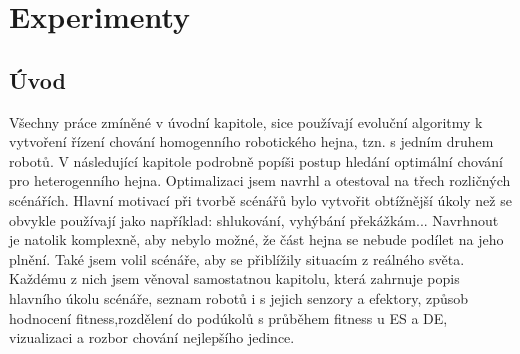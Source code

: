 \chapter{Experimenty}
\section{Úvod}
Všechny práce zmíněné v úvodní kapitole, sice používají evoluční algoritmy k vytvoření řízení chování homogenního robotického hejna, tzn. s jedním druhem robotů. V následující kapitole podrobně popíši postup hledání optimální chování pro heterogenního hejna. Optimalizaci jsem navrhl a otestoval na třech rozličných scénářích. Hlavní motivací při tvorbě scénářů bylo vytvořit obtížnější úkoly než se obvykle používají jako například: shlukování, vyhýbání překážkám... Navrhnout je natolik komplexně, aby nebylo možné, že část hejna se nebude podílet na jeho plnění. Také jsem volil scénáře, aby se přiblížily situacím z reálného světa. Každému z nich jsem věnoval samostatnou kapitolu, která zahrnuje popis hlavního úkolu scénáře, seznam robotů i s jejich senzory a efektory, způsob hodnocení fitness,rozdělení do podúkolů s průběhem fitness u ES a DE, vizualizaci a rozbor chování nejlepšího jedince.  
